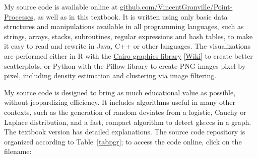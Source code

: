 \documentclass[10pt]{article}
\begin{document}
My source code is available online at \href{https://github.com/VincentGranville/Point-Processes}{github.com/VincentGranville/Point-Processes}, as well
as in this textbook. It is written using only basic data structures and manipulations available in all programming languages, such as
strings, arrays, stacks, subroutines, regular expressions and \textcolor{index}{hash tables},
to make it easy to read and rewrite in Java, C++ or other languages. The visualizations are performed either in R with the
\href{https://www.cairographics.org/}{Cairo graphics library}
[\href{https://en.wikipedia.org/wiki/Cairo_(graphics)}{Wiki}] to create better scatterplots, or Python with the Pillow library to create PNG images pixel by pixel,
including density estimation and clustering via image filtering.

My source code is designed to bring as much educational value as possible, without jeopardizing efficiency. It includes algorithms useful in many other contexts, such as the generation of random deviates from a logistic, Cauchy or Laplace distribution,  and a fast, compact algorithm to detect
\glspl{gls:cc} in a graph.
The textbook version has detailed explanations. The source code
repository is organized according to Table~\ref{tabpgr}; to access the code online, click on the filename:
\end{document}
